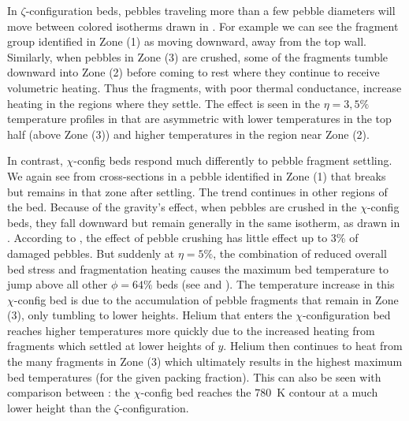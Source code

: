 In $\zeta$-configuration beds, pebbles traveling more than a few pebble diameters will move between colored isotherms drawn in . For example we can see the fragment group identified in Zone (1) as moving downward, away from the top wall. Similarly, when pebbles in Zone (3) are crushed, some of the fragments tumble downward into Zone (2) before coming to rest where they continue to receive volumetric heating. Thus the fragments, with poor thermal conductance, increase heating in the regions where they settle. The effect is seen in the $\eta = 3, 5\%$ temperature profiles in  that are asymmetric with lower temperatures in the top half (above Zone (3)) and higher temperatures in the region near Zone (2).

In contrast, $\chi$-config beds respond much differently to pebble fragment settling. We again see from cross-sections in  a pebble identified in Zone (1) that breaks but remains in that zone after settling. The trend continues in other regions of the bed. Because of the gravity's effect, when pebbles are crushed in the $\chi$-config beds, they fall downward but remain generally in the same isotherm, as drawn in . According to , the effect of pebble crushing has little effect up to 3\% of damaged pebbles. But suddenly at $\eta = 5\%$, the combination of reduced overall bed stress and fragmentation heating causes the maximum bed temperature to jump above all other $\phi = 64\%$ beds (see  and ). The temperature increase in this $\chi$-config bed is due to the accumulation of pebble fragments that remain in Zone (3), only tumbling to lower heights. Helium that enters the $\chi$-configuration bed reaches higher temperatures more quickly due to the increased heating from fragments which settled at lower heights of $y$. Helium then continues to heat from the many fragments in Zone (3) which ultimately results in the highest maximum bed temperatures (for the given packing fraction). This can also be seen with comparison between : the $\chi$-config bed reaches the $780$~\si{\kelvin} contour at a much lower height than the $\zeta$-configuration. 




